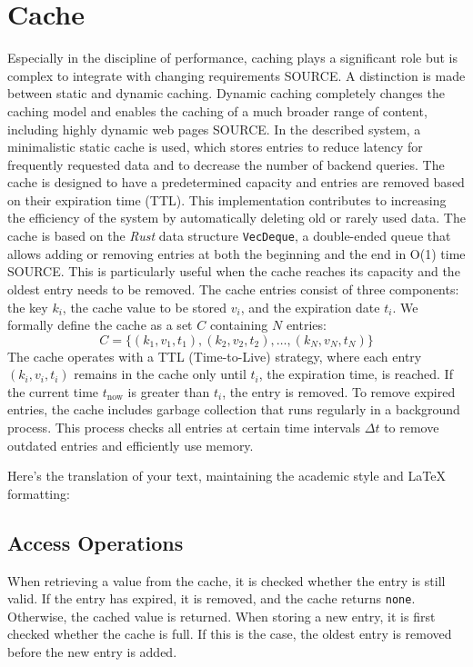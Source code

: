 \documentclass[twocolumn]{webofc}
\begin{document}
\section{Cache}
Especially in the discipline of performance, caching plays a significant role but is complex to integrate with changing requirements {\color{red} SOURCE}. A distinction is made between static and dynamic caching. Dynamic caching completely changes the caching model and enables the caching of a much broader range of content, including highly dynamic web pages {\color{red} SOURCE}. In the described system, a minimalistic static cache is used, which stores entries to reduce latency for frequently requested data and to decrease the number of backend queries. The cache is designed to have a predetermined capacity and entries are removed based on their expiration time (TTL). This implementation contributes to increasing the efficiency of the system by automatically deleting old or rarely used data. The cache is based on the \textit{Rust} data structure \texttt{VecDeque}, a double-ended queue that allows adding or removing entries at both the beginning and the end in O(1) time {\color{red} SOURCE}. This is particularly useful when the cache reaches its capacity and the oldest entry needs to be removed. The cache entries consist of three components: the key \( k_i \), the cache value to be stored \( v_i \), and the expiration date \( t_i \). We formally define the cache as a set \( C \) containing \( N \) entries:
\[
C = \{ (k_1, v_1, t_1), (k_2, v_2, t_2), \dots, (k_N, v_N, t_N) \}
\]
The cache operates with a TTL (Time-to-Live) strategy, where each entry \( (k_i, v_i, t_i) \) remains in the cache only until \( t_i \), the expiration time, is reached. If the current time \( t_{\text{now}} \) is greater than \( t_i \), the entry is removed. To remove expired entries, the cache includes garbage collection that runs regularly in a background process. This process checks all entries at certain time intervals \( \Delta t \) to remove outdated entries and efficiently use memory.

Here's the translation of your text, maintaining the academic style and LaTeX formatting:

\subsection{Access Operations}
When retrieving a value from the cache, it is checked whether the entry is still valid. If the entry has expired, it is removed, and the cache returns \texttt{none}. Otherwise, the cached value is returned. When storing a new entry, it is first checked whether the cache is full. If this is the case, the oldest entry is removed before the new entry is added.
\end{document}
